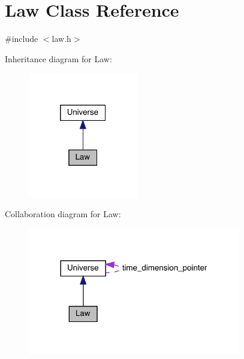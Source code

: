 \hypertarget{class_law}{}\section{Law Class Reference}
\label{class_law}


{\ttfamily \#include $<$law.\+h$>$}



Inheritance diagram for Law\+:\nopagebreak
\begin{figure}[H]
\begin{center}
\leavevmode
\includegraphics[width=136pt]{class_law__inherit__graph}
\end{center}
\end{figure}


Collaboration diagram for Law\+:
\nopagebreak
\begin{figure}[H]
\begin{center}
\leavevmode
\includegraphics[width=263pt]{class_law__coll__graph}
\end{center}
\end{figure}
